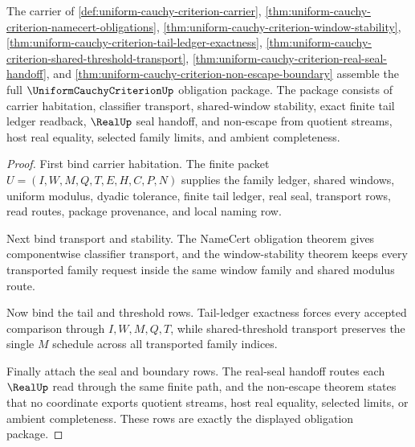 \begin{theorem}
\label{thm:uniform-cauchy-criterion-obligation-assembly}
The carrier of \autoref{def:uniform-cauchy-criterion-carrier},
\autoref{thm:uniform-cauchy-criterion-namecert-obligations},
\autoref{thm:uniform-cauchy-criterion-window-stability},
\autoref{thm:uniform-cauchy-criterion-tail-ledger-exactness},
\autoref{thm:uniform-cauchy-criterion-shared-threshold-transport},
\autoref{thm:uniform-cauchy-criterion-real-seal-handoff}, and
\autoref{thm:uniform-cauchy-criterion-non-escape-boundary} assemble the full
$\UniformCauchyCriterionUp$ obligation package. The package consists of carrier
habitation, classifier transport, shared-window stability, exact finite tail
ledger readback, $\RealUp$ seal handoff, and non-escape from quotient streams,
host real equality, selected family limits, and ambient completeness.
\end{theorem}
\begin{proof}
First bind carrier habitation. The finite packet
$U=(I,W,M,Q,T,E,H,C,P,N)$ supplies the family ledger, shared windows, uniform
modulus, dyadic tolerance, finite tail ledger, real seal, transport rows, read
routes, package provenance, and local naming row.

Next bind transport and stability. The NameCert obligation theorem gives
componentwise classifier transport, and the window-stability theorem keeps
every transported family request inside the same window family and shared
modulus route.

Now bind the tail and threshold rows. Tail-ledger exactness forces every
accepted comparison through $I,W,M,Q,T$, while shared-threshold transport
preserves the single $M$ schedule across all transported family indices.

Finally attach the seal and boundary rows. The real-seal handoff routes each
$\RealUp$ read through the same finite path, and the non-escape theorem states
that no coordinate exports quotient streams, host real equality, selected
limits, or ambient completeness. These rows are exactly the displayed
obligation package.
\end{proof}

